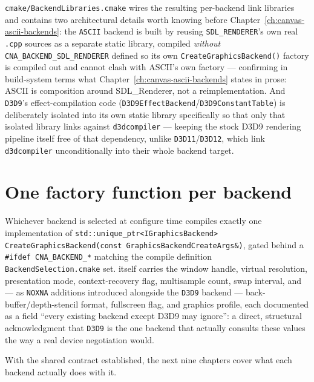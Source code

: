 \texttt{cmake/BackendLibraries.cmake} wires the resulting per-backend link libraries and
contains two architectural details worth knowing before Chapter~\ref{ch:canvas-ascii-backends}:
the \texttt{ASCII} backend is built by reusing \texttt{SDL\_RENDERER}'s own real \texttt{.cpp}
sources as a separate static library, compiled \emph{without} \texttt{CNA\_BACKEND\_SDL\_RENDERER}
defined so its own \texttt{CreateGraphicsBackend()} factory is compiled out and cannot clash
with ASCII's own factory --- confirming in build-system terms what
Chapter~\ref{ch:canvas-ascii-backends} states in prose: ASCII is composition around
SDL\_Renderer, not a reimplementation. And \texttt{D3D9}'s effect-compilation code
(\texttt{D3D9EffectBackend}/\texttt{D3D9ConstantTable}) is deliberately isolated into its own
static library specifically so that only that isolated library links against
\texttt{d3dcompiler} --- keeping the stock D3D9 rendering pipeline itself free of that
dependency, unlike \texttt{D3D11}/\texttt{D3D12}, which link \texttt{d3dcompiler}
unconditionally into their whole backend target.

\section{One factory function per backend}

Whichever backend is selected at configure time compiles exactly one implementation of
\texttt{std::unique\_ptr<IGraphicsBackend> CreateGraphicsBackend(const
GraphicsBackendCreateArgs\&)}, gated behind a \texttt{\#ifdef CNA\_BACKEND\_*} matching the
compile definition \texttt{BackendSelection.cmake} set. 
itself carries the window handle, virtual resolution, presentation mode, context-recovery
flag, multisample count, swap interval, and --- as \texttt{NOXNA} additions introduced
alongside the \texttt{D3D9} backend --- back-buffer/depth-stencil format, fullscreen flag,
and graphics profile, each documented as a field ``every existing backend except D3D9 may
ignore'': a direct, structural acknowledgment that \texttt{D3D9} is the one backend that
actually consults these values the way a real device negotiation would.

With the shared contract established, the next nine chapters cover what each backend
actually does with it.
